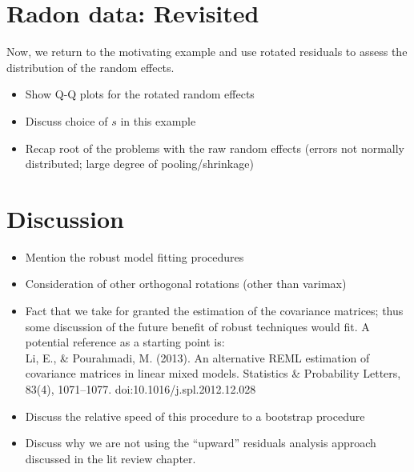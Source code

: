 \documentclass[12pt]{article} %
\begin{document}
\section{Radon data: Revisited}\label{sec:radon2}

Now, we return to the motivating example and use rotated residuals to assess the distribution of the random effects.

\begin{itemize}
\item Show Q-Q plots for the rotated random effects
\item Discuss choice of $s$ in this example
\item Recap root of the problems with the raw random effects (errors not normally distributed; large degree of pooling/shrinkage)
\end{itemize}

\section{Discussion}\label{sec:discussion}

\begin{itemize}
\item Mention the robust model fitting procedures
\item Consideration of other orthogonal rotations (other than varimax)
\item Fact that we take for granted the estimation of the covariance matrices; thus some discussion of the future benefit of robust techniques would fit. A potential reference as a starting point is:\\ Li, E., \& Pourahmadi, M. (2013). An alternative REML estimation of covariance matrices in linear mixed models. Statistics \& Probability Letters, 83(4), 1071--1077. doi:10.1016/j.spl.2012.12.028
\item Discuss the relative speed of this procedure to a bootstrap procedure
\item Discuss why we are not using the ``upward'' residuals analysis approach discussed in the lit review chapter.
\end{itemize}
\end{document}
